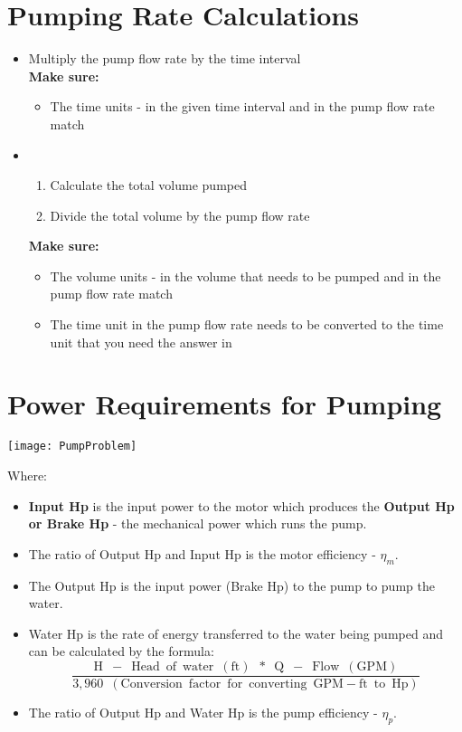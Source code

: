 \section{Pumping Rate Calculations}
\begin{itemize}
\item {} Multiply the pump flow rate by the time interval\\
\textbf{Make sure:}
\begin{itemize}
\item The time units - in the given time interval and in the pump flow rate match
\end{itemize}
\item {}
\begin{enumerate}[Step 1.]
\item Calculate the total volume pumped
\item Divide the total volume by the pump flow rate
\end{enumerate}
\textbf{Make sure:}
\begin{itemize}
\item The volume units - in the volume that needs to be pumped and in the pump flow rate match
\item The time unit in the pump flow rate needs to be converted to the time unit that you need the answer in
\end{itemize}
\end{itemize}

\section{Power Requirements for Pumping}
\begin{center}
\texttt{[image: PumpProblem]}\\
\end{center}
Where:\\
\begin{itemize}
\item \textbf{Input Hp} is the input power to the motor which produces the \textbf{Output Hp or Brake Hp} - the mechanical power which runs the pump.  
\item The ratio of Output Hp and Input Hp is the motor efficiency - $\eta_m$.
\item The Output Hp is the input power (Brake Hp) to the pump to pump the water.
\item Water Hp is the rate of energy transferred to the water being pumped and can be calculated by the formula:\\
$$\dfrac{\mathrm{H \enspace - \enspace Head \enspace of \enspace water \enspace (ft) \enspace * \enspace Q \enspace - \enspace Flow \enspace (GPM)}}{3,960 \enspace \mathrm{(Conversion \enspace factor \enspace for \enspace converting \enspace GPM-ft \enspace to \enspace Hp)}}$$
\item The ratio of Output Hp and Water Hp is the pump efficiency - $\eta_p$.
\end{itemize}



